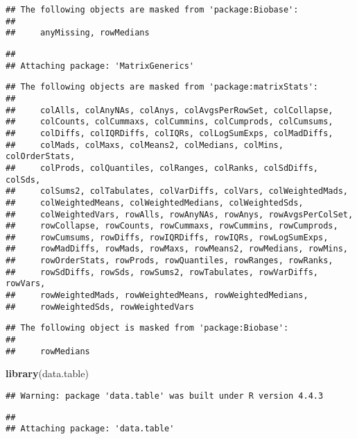 \documentclass[
]{article}
\newenvironment{Shaded}{\begin{snugshade}}{\end{snugshade}}
\newcommand{\FunctionTok}[1]{\textcolor[rgb]{0.13,0.29,0.53}{\textbf{#1}}}
\newcommand{\NormalTok}[1]{#1}
\begin{document}
\begin{verbatim}
## The following objects are masked from 'package:Biobase':
## 
##     anyMissing, rowMedians
\end{verbatim}

\begin{verbatim}
## 
## Attaching package: 'MatrixGenerics'
\end{verbatim}

\begin{verbatim}
## The following objects are masked from 'package:matrixStats':
## 
##     colAlls, colAnyNAs, colAnys, colAvgsPerRowSet, colCollapse,
##     colCounts, colCummaxs, colCummins, colCumprods, colCumsums,
##     colDiffs, colIQRDiffs, colIQRs, colLogSumExps, colMadDiffs,
##     colMads, colMaxs, colMeans2, colMedians, colMins, colOrderStats,
##     colProds, colQuantiles, colRanges, colRanks, colSdDiffs, colSds,
##     colSums2, colTabulates, colVarDiffs, colVars, colWeightedMads,
##     colWeightedMeans, colWeightedMedians, colWeightedSds,
##     colWeightedVars, rowAlls, rowAnyNAs, rowAnys, rowAvgsPerColSet,
##     rowCollapse, rowCounts, rowCummaxs, rowCummins, rowCumprods,
##     rowCumsums, rowDiffs, rowIQRDiffs, rowIQRs, rowLogSumExps,
##     rowMadDiffs, rowMads, rowMaxs, rowMeans2, rowMedians, rowMins,
##     rowOrderStats, rowProds, rowQuantiles, rowRanges, rowRanks,
##     rowSdDiffs, rowSds, rowSums2, rowTabulates, rowVarDiffs, rowVars,
##     rowWeightedMads, rowWeightedMeans, rowWeightedMedians,
##     rowWeightedSds, rowWeightedVars
\end{verbatim}

\begin{verbatim}
## The following object is masked from 'package:Biobase':
## 
##     rowMedians
\end{verbatim}

\begin{Shaded}
\begin{Highlighting}[]
\FunctionTok{library}\NormalTok{(data.table)}
\end{Highlighting}
\end{Shaded}

\begin{verbatim}
## Warning: package 'data.table' was built under R version 4.4.3
\end{verbatim}

\begin{verbatim}
## 
## Attaching package: 'data.table'
\end{verbatim}
\end{document}
